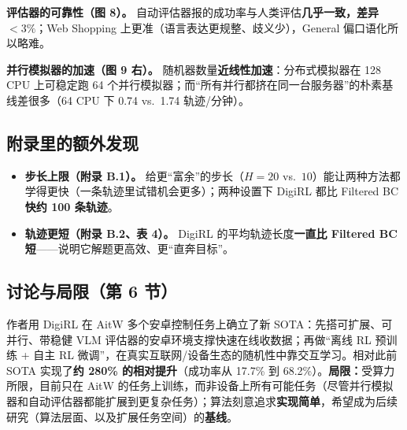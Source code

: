 \documentclass[11pt,UTF8,fontset=fandol]{ctexart}
\begin{document}
\textbf{评估器的可靠性（图 8）。} 自动评估器报的成功率与人类评估\textbf{几乎一致，差异 $<3\%$}；Web Shopping 上更准（语言表达更规整、歧义少），General 偏口语化所以略难。

\textbf{并行模拟器的加速（图 9 右）。} 随机器数量\textbf{近线性加速}：分布式模拟器在 128 CPU 上可稳定跑 64 个并行模拟器；而“所有并行都挤在同一台服务器”的朴素基线差很多（64 CPU 下 0.74 vs.\ 1.74 轨迹/分钟）。

\subsection*{附录里的额外发现}
\begin{itemize}[leftmargin=1.4em]
\item \textbf{步长上限（附录 B.1）。} 给更“富余”的步长（$H{=}20$ vs.\ $10$）能让两种方法都学得更快（一条轨迹里试错机会更多）；两种设置下 DigiRL 都比 Filtered BC \textbf{快约 100 条轨迹}。
\item \textbf{轨迹更短（附录 B.2、表 4）。} DigiRL 的平均轨迹长度\textbf{一直比 Filtered BC 短}——说明它解题更高效、更“直奔目标”。
\end{itemize}

\subsection{讨论与局限（第 6 节）}
作者用 DigiRL 在 AitW 多个安卓控制任务上确立了新 SOTA：先搭可扩展、可并行、带稳健 VLM 评估器的安卓环境支撑快速在线收数据；再做“离线 RL 预训练 + 自主 RL 微调”，在真实互联网/设备生态的随机性中靠交互学习。相对此前 SOTA 实现了\textbf{约 280\% 的相对提升}（成功率从 17.7\% 到 68.2\%）。\textbf{局限：}受算力所限，目前只在 AitW 的任务上训练，而非设备上所有可能任务（尽管并行模拟器和自动评估器都能扩展到更复杂任务）；算法刻意追求\textbf{实现简单}，希望成为后续研究（算法层面、以及扩展任务空间）的\textbf{基线}。
\end{document}
